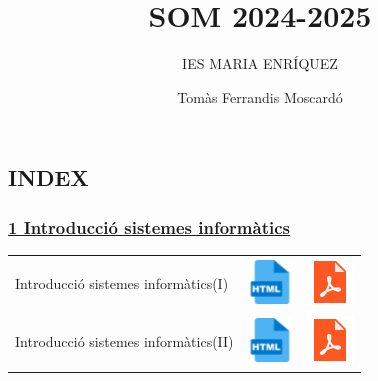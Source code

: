 \documentclass[
  12 pt,
  a4paper,
]{article}
\title{SOM 2024-2025}
\subtitle{IES MARIA ENRÍQUEZ}
\author{Tomàs Ferrandis Moscardó}
\date{}
\begin{document}
\maketitle

\subsection{INDEX}\label{index}

\subsubsection{\texorpdfstring{\hyperref[U1]{1 Introducció sistemes
informàtics}}{1 Introducció sistemes informàtics}}\label{introducciuxf3-sistemes-informuxe0tics}

\begin{longtable}[]{@{}
  >{\raggedright\arraybackslash}p{}
  >{\raggedright\arraybackslash}p{}
  >{\raggedright\arraybackslash}p{}@{}}
\toprule\noalign{}
\endhead
\bottomrule\noalign{}
\endlastfoot
Introducció sistemes informàtics(I) &
\href{U1-INTRODUCCIÓ_ALS_SISTEMES_INFORMÀTICS/UNITAT-1-Introducció-als-sistemes-informàtics.html}{\includegraphics{recursos/iconohtml.png}}
&
\href{U1-INTRODUCCIÓ_ALS_SISTEMES_INFORMÀTICS/UNITAT-1-Introducció-als-sistemes-informàtics.pdf}{\includegraphics{recursos/iconopdf.png}} \\
Introducció sistemes informàtics(II) &
\href{U1-INTRODUCCIÓ_ALS_SISTEMES_INFORMÀTICS/UNITAT-1-Introducció-als-sistemes-informàtics-Representació-Informació.html}{\includegraphics{recursos/iconohtml.png}}
&
\href{U1-INTRODUCCIÓ_ALS_SISTEMES_INFORMÀTICS/UNITAT-1-Introducció-als-sistemes-informàtics-Representació-Informació.pdf}{\includegraphics{recursos/iconopdf.png}} \\

\end{longtable}
\end{document}
